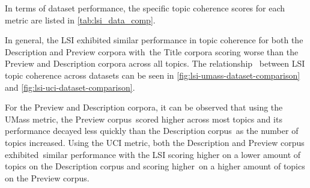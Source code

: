 \documentclass[letterpaper,12pt]{article}
\begin{document}
In terms of dataset performance, the specific topic coherence scores for each metric are listed in \ref{tab:lsi_data_comp}.

In general, the LSI exhibited similar performance in topic coherence for both the Description and Preview corpora with\
the Title corpora scoring worse than the Preview and Description corpora across all topics. The relationship \
between LSI topic coherence across datasets can be seen in \ref{fig:lsi-umass-dataset-comparison} and \ref{fig:lsi-uci-dataset-comparison}.

For the Preview and Description corpora, it can be observed that using the UMass metric, the Preview corpus\
scored higher across most topics and its performance decayed less quickly than the Description corpus\
as the number of topics increased. Using the UCI metric, both the Description and Preview corpus exhibited\
similar performance with the LSI scoring higher on a lower amount of topics on the Description corpus and scoring higher\
on a higher amount of topics on the Preview corpus. 
\end{document}
